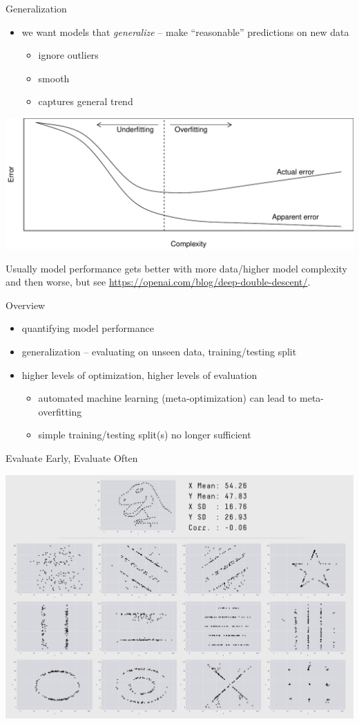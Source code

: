 \begin{frame}[c]{Generalization}
    \begin{itemize}
        \item we want models that \emph{generalize} -- make ``reasonable''
            predictions on new data
            \begin{itemize}
                \item ignore outliers
                \item smooth
                \item captures general trend
            \end{itemize}
    \end{itemize}
    \begin{center}
        \includegraphics[width=.5\textwidth]{overfitting}
    \end{center}
    Usually model performance gets better with more data/higher model complexity
    and then worse, but see \url{https://openai.com/blog/deep-double-descent/}.
\end{frame}

\begin{frame}[c]{Overview}
    \begin{itemize}
        \item quantifying model performance
        \item generalization -- evaluating on unseen data, training/testing
            split
        \item higher levels of optimization, higher levels of evaluation
            \begin{itemize}
                \item automated machine learning (meta-optimization) can lead to
                    meta-overfitting
                \item simple training/testing split(s) no longer sufficient
            \end{itemize}
    \end{itemize}
\end{frame}

\begin{frame}[c]{Evaluate Early, Evaluate Often}
    \begin{center}
        \includegraphics[width=.6\textwidth]{datasaurus}
    \end{center}
\end{frame}


